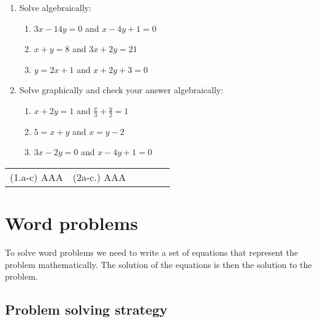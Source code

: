 \begin{exercises}{}
{
\begin{enumerate}[noitemsep, label=\textbf{\arabic*}. ] 
\item Solve algebraically: 
\begin{enumerate}[noitemsep, label=\textbf{(\alph*)} ] 
\item $3x-14y=0$ and $x-4y+1=0$
\item $x+y=8$ and $3x + 2y = 21$
\item $y=2x+1$ and $x + 2y + 3 = 0$
\end{enumerate}

\item Solve graphically and check your answer algebraically:

\begin{enumerate}[noitemsep, label=\textbf{(\alph*)} ] 

\item  $x+2y=1$ and $\frac{x}{3} + \frac{y}{2} = 1$
\item $5= x+y$ and $x = y-2$
\item $3x - 2y = 0$ and $x - 4y + 1 = 0$

\end{enumerate}
\end{enumerate}
\practiceinfo
\par 
\par \begin{tabular}[h]{cccccc}
(1.a-c) AAA &  (2a-c.) AAA
& \end{tabular}
}
\end{exercises}

\section{Word problems}

To solve word problems we need to write a set of equations that represent the problem mathematically. 
The solution of the equations is then the solution to the problem.

\subsection*{Problem solving strategy}

